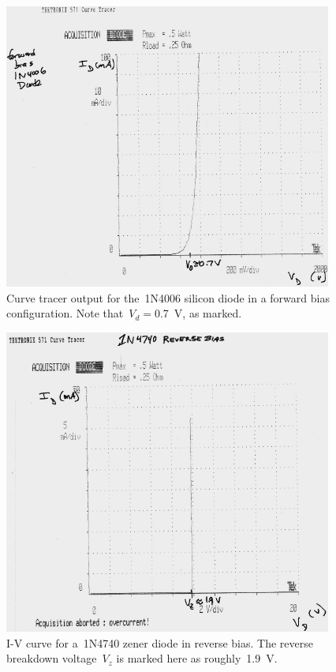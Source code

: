 \begin{figure}[H]
	\centering
	\includegraphics[width=4.25in]{img/diodeCurveTrace.png}
	\parbox{4.25in}{
	\caption{Curve tracer output for the~1N4006 silicon diode in a forward bias configuration.  Note that~$V_d=$\SI{0.7}{\volt}, as marked.}
	\label{fig:diodeCurve}}
\end{figure}

\begin{figure}[H]
	\centering
	\includegraphics[width=4.25in]{img/zenerCurveTrace.png}
	\parbox{4.25in}{
	\caption{I-V curve for a~1N4740 zener diode in reverse bias.  The reverse
	breakdown voltage~$V_z$ is marked here as roughly~\SI{1.9}{\volt}.}
	\label{fig:zenerCurve}}
\end{figure}

